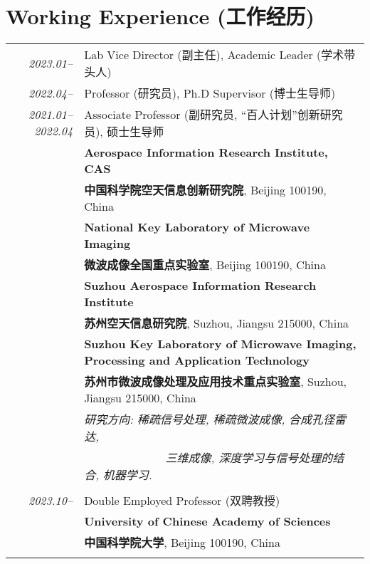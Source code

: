 \documentclass[paper=a4,fontsize=11pt]{scrartcl}
\begin{document}
\section*{Working Experience (工作经历)}

\begin{longtable}{r|p{12cm}}
	
\emph{2023.01--} & Lab Vice Director (副主任), Academic Leader (学术带头人)\\	
\emph{2022.04--} & Professor (研究员), Ph.D Supervisor (博士生导师)\\	
\emph{2021.01--2022.04} & Associate Professor (副研究员, ``百人计划''创新研究员), 硕士生导师\\	
	& \normalsize\textbf{Aerospace Information Research Institute, CAS}\\
	& \normalsize\textbf{中国科学院空天信息创新研究院}, Beijing 100190, China \\
	& \normalsize\textbf{National Key Laboratory of Microwave Imaging}\\
	& \normalsize\textbf{微波成像全国重点实验室}, Beijing 100190, China \\
	& \normalsize\textbf{Suzhou Aerospace Information Research Institute}\\
	& \normalsize\textbf{苏州空天信息研究院}, Suzhou, Jiangsu 215000, China\\
	& \normalsize\textbf{Suzhou Key Laboratory of Microwave Imaging, Processing and Application Technology}\\
	& \normalsize\textbf{苏州市微波成像处理及应用技术重点实验室}, Suzhou, Jiangsu 215000, China\\
	& \emph{研究方向: 稀疏信号处理, 稀疏微波成像, 合成孔径雷达,}\\
	& \emph{~~~~~~~~~~~~~~三维成像, 深度学习与信号处理的结合, 机器学习.} \\
	\multicolumn{2}{c}{} \\
	
\emph{2023.10--} & Double Employed Professor (双聘教授)\\	
& \normalsize\textbf{University of Chinese Academy of Sciences}\\
& \normalsize\textbf{中国科学院大学}, Beijing 100190, China \\
\multicolumn{2}{c}{} \\


\end{longtable}
\end{document}
